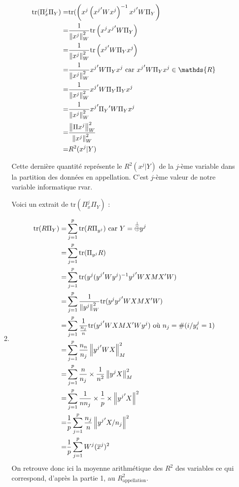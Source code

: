 \documentclass{article}
\begin{document}
\begin{enumerate}
\begin{enumerate}
\begin{align*}
\tr(\Pi_x^j \Pi_Y) =& \tr(\left(x^j\left( {x^j}' W x^j\right)^{-1} {x^j}' W \Pi_Y \right) \\
				   =& \frac{1}{\norme{x^j}_{W}^2} \tr\left(x^j {x^j}' W \Pi_Y\right) \\
				   =& \frac{1}{\norme{x^j}_{W}^2} \tr\left( {x^j}' W \Pi_Y x^j\right) \\
				   =& \frac{1}{\norme{x^j}_{W}^2}  {x^j}' W \Pi_Y x^j \text{ car } {x^j}' W \Pi_Y x^j \in \mathds{R} \\
				   =& \frac{1}{\norme{x^j}_{W}^2}  {x^j}' W \Pi_Y \Pi_Y x^j \\
				   =& \frac{1}{\norme{x^j}_{W}^2}  {x^j}' {\Pi_Y}' W  \Pi_Y x^j \\ 
				   =& \frac{\norme{\Pi x^j}_{W}^2}{\norme{x^j}_{W}^2} \\
				   =& R^2(x^j | Y)	     
\end{align*}	
	
	Cette dernière quantité représente le $R^2(x^j | Y)$ de la $j$-ème variable dans la partition des données en appellation. C'est $j$-ème valeur de notre variable informatique rvar.
	
	Voici un extrait de $\text{tr}(\Pi_x^j \Pi_Y)$ :	
	
	\item \begin{align*}
	 \text{tr}(R \Pi_Y)=&\sum_{j=1}^p  \text{tr}(R \Pi_{y^j}) \text{ car } Y=\overset{\perp}{\oplus} y^j \\
	 =& \sum_{j=1}^p \text{tr}(\Pi_{y^j} R ) \\
	 =& \sum_{j=1}^p \text{tr}(y^j({y^j}'Wy^j)^{-1}{y^j}'WXMX'W)\\
	 =& \sum_{j=1}^p \frac{1}{\left\| y^j\right\|_W^2} \text{tr}(y^j {y^j}'WXMX'W) \\
	 =& \sum_{j=1}^p \frac{1}{\frac{n_{j}}{n}} \text{tr}({y^j}'WXMX'Wy^j ) \text{ où } n_{j}= \#(i/y_{i}^j=1)\\
	 =& \sum_{j=1}^p \frac{n_{n}}{n_j}\left\| {y^j}'WX\right\|_M^2 \\
	 =& \sum_{j=1}^p \frac{n}{n_j}\times \frac{1}{n^2} \left\| y^jX\right\|_M^2\\
	 =& \sum_{j=1}^p \frac{1}{n n_{j}} \times \frac{1}{p} \times \left\| {y^j}'X\right\|^2 \\
	 =& \frac{1}{p} \sum_{j=1}^p \frac{n_{j}}{n} \left\| {y^j}' X / n_j\right\|^2\\
	 =& \frac{1}{p} \sum_{j=1}^p W^j (\overline{x}^j)^2
	\end{align*}
	On retrouve donc ici la moyenne arithmétique des $R^2$ des variables ce qui correspond, d'après la partie 1, au $R^2_{\text{appellation}}$.
	

\end{enumerate}
\end{enumerate}
\end{document}
